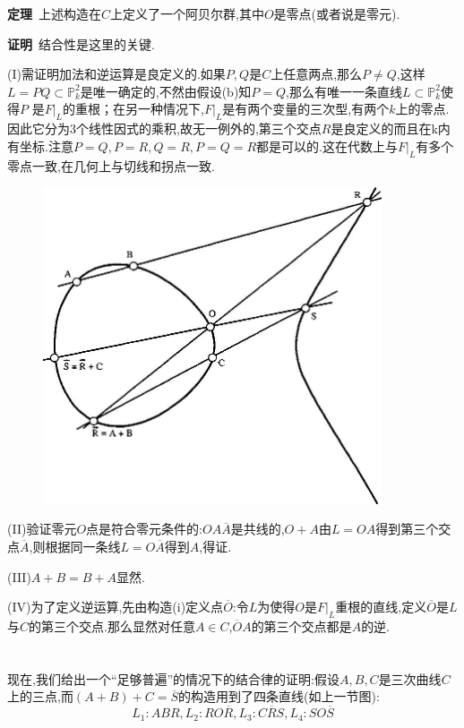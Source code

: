 \documentclass[UTF8]{book}
\begin{document}
		\textbf{定理}\ 上述构造在$ C $上定义了一个阿贝尔群,其中$ O $是零点(或者说是零元).
		
		\textbf{证明}\ 结合性是这里的关键.
		
		
		(I)需证明加法和逆运算是良定义的.如果$ P,Q $是$ C $上任意两点,那么$ P \ne Q $,这样$L=PQ\subset \mathbb{P}^{2}_{k}$是唯一确定的,不然由假设(b)知$ P=Q $,那么有唯一一条直线$L\subset \mathbb{P}^{2}_{k}$使得$ P $ 是$F|_{L}$的重根；在另一种情况下,$F|_{L}$是有两个变量的三次型,有两个$ k $上的零点.因此它分为3个线性因式的乘积,故无一例外的,第三个交点$ R $是良定义的而且在k内有坐标.注意$ P=Q,P=R,Q=R,P=Q=R $都是可以的.这在代数上与$F|_{L}$有多个零点一致,在几何上与切线和拐点一致.
		
		
		\begin{figure}[H]
		  \centering
		  \includegraphics[width=10cm]{34.jpg}
		\end{figure}
		(II)验证零元$ O $点是符合零元条件的:$OA\overline{A}$是共线的,$ O+A $由$ L=OA $得到第三个交点$\overline{A}$,则根据同一条线$L=O\overline{A}$得到$ A $,得证.
		
		
		(III)$ A+B=B+A $显然.
		
			
		(IV)为了定义逆运算,先由构造(i)定义点$\overline{O}$:令$ L $为使得$ O $是$F|_{L}$重根的直线,定义$\overline{O}$是$ L $与$ C $的第三个交点.那么显然对任意$ A \in C $,$\overline{O} A$的第三个交点都是$ A  $的逆.
	\section{}
		现在,我们给出一个“足够普遍”的情况下的结合律的证明:假设$ A,B,C $是三次曲线$ C $上的三点,而$(A+B)+C=\overline{S}$的构造用到了四条直线(如上一节图):
		\begin{equation*}
			L_{1}:ABR,L_{2}:RO\overline{R},L_{3}:C\overline{R}S,L_{4}:SO\overline{S}
		\end{equation*}
	
\end{document}
